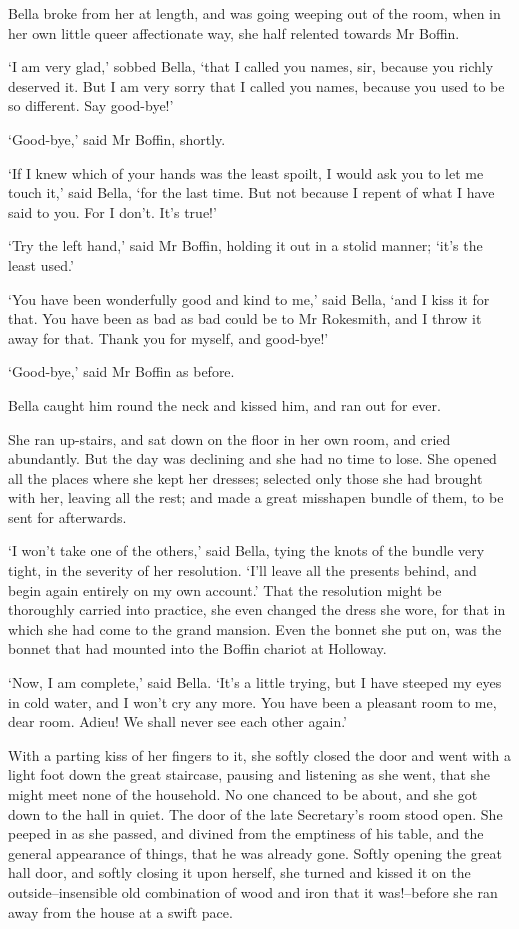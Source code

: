 Bella broke from her at length, and was going weeping out of the room,
when in her own little queer affectionate way, she half relented towards
Mr Boffin.

‘I am very glad,’ sobbed Bella, ‘that I called you names, sir, because
you richly deserved it. But I am very sorry that I called you names,
because you used to be so different. Say good-bye!’

‘Good-bye,’ said Mr Boffin, shortly.

‘If I knew which of your hands was the least spoilt, I would ask you
to let me touch it,’ said Bella, ‘for the last time. But not because I
repent of what I have said to you. For I don’t. It’s true!’

‘Try the left hand,’ said Mr Boffin, holding it out in a stolid manner;
‘it’s the least used.’

‘You have been wonderfully good and kind to me,’ said Bella, ‘and I kiss
it for that. You have been as bad as bad could be to Mr Rokesmith, and I
throw it away for that. Thank you for myself, and good-bye!’

‘Good-bye,’ said Mr Boffin as before.

Bella caught him round the neck and kissed him, and ran out for ever.

She ran up-stairs, and sat down on the floor in her own room, and cried
abundantly. But the day was declining and she had no time to lose. She
opened all the places where she kept her dresses; selected only those
she had brought with her, leaving all the rest; and made a great
misshapen bundle of them, to be sent for afterwards.

‘I won’t take one of the others,’ said Bella, tying the knots of the
bundle very tight, in the severity of her resolution. ‘I’ll leave all
the presents behind, and begin again entirely on my own account.’ That
the resolution might be thoroughly carried into practice, she even
changed the dress she wore, for that in which she had come to the grand
mansion. Even the bonnet she put on, was the bonnet that had mounted
into the Boffin chariot at Holloway.

‘Now, I am complete,’ said Bella. ‘It’s a little trying, but I have
steeped my eyes in cold water, and I won’t cry any more. You have been
a pleasant room to me, dear room. Adieu! We shall never see each other
again.’

With a parting kiss of her fingers to it, she softly closed the door and
went with a light foot down the great staircase, pausing and listening
as she went, that she might meet none of the household. No one chanced
to be about, and she got down to the hall in quiet. The door of the late
Secretary’s room stood open. She peeped in as she passed, and divined
from the emptiness of his table, and the general appearance of things,
that he was already gone. Softly opening the great hall door, and
softly closing it upon herself, she turned and kissed it on the
outside--insensible old combination of wood and iron that it
was!--before she ran away from the house at a swift pace.

